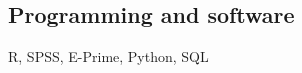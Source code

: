 \documentclass[margin, 11pt]{res} %
\begin{document}
\begin{resume}
\section{\sc Programming and software}
R, SPSS, E-Prime, Python, SQL




%
%
 



%


\end{resume}
\end{document}
